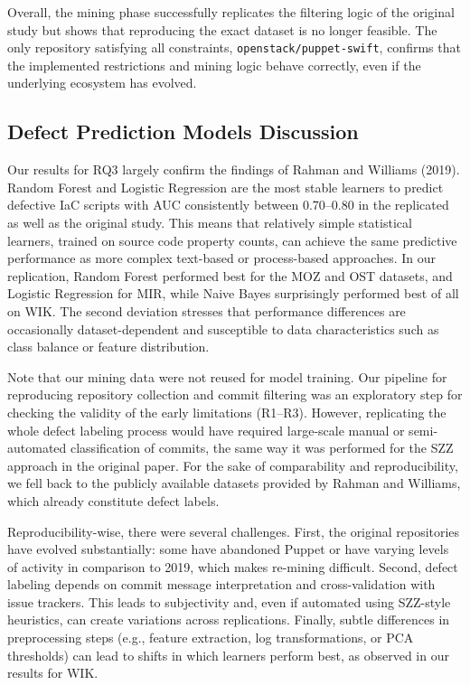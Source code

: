\documentclass[conference]{IEEEtran}
\begin{document}
Overall, the mining phase successfully replicates the filtering logic of the original study but shows that reproducing the exact dataset is no longer feasible. The only repository satisfying all constraints, \texttt{openstack/puppet-swift}, confirms that the implemented restrictions and mining logic behave correctly, even if the underlying ecosystem has evolved.

\subsection{Defect Prediction Models Discussion}
Our results for RQ3 largely confirm the findings of Rahman and Williams (2019).
Random Forest and Logistic Regression are the most stable learners to predict defective IaC scripts with AUC consistently between 0.70–0.80 in the replicated as well as the original study.
This means that relatively simple statistical learners, trained on source code property counts, can achieve the same predictive performance as more complex text-based or process-based approaches.
In our replication, Random Forest performed best for the MOZ and OST datasets, and Logistic Regression for MIR, while Naive Bayes surprisingly performed best of all on WIK.
The second deviation stresses that performance differences are occasionally dataset-dependent and susceptible to data characteristics such as class balance or feature distribution.

Note that our mining data were not reused for model training.
Our pipeline for reproducing repository collection and commit filtering was an exploratory step for checking the validity of the early limitations (R1–R3).
However, replicating the whole defect labeling process would have required large-scale manual or semi-automated classification of commits, the same way it was performed for the SZZ approach in the original paper.
For the sake of comparability and reproducibility, we fell back to the publicly available datasets provided by Rahman and Williams, which already constitute defect labels.

Reproducibility-wise, there were several challenges.
First, the original repositories have evolved substantially: some have abandoned Puppet or have varying levels of activity in comparison to 2019, which makes re-mining difficult.
Second, defect labeling depends on commit message interpretation and cross-validation with issue trackers.
This leads to subjectivity and, even if automated using SZZ-style heuristics, can create variations across replications.
Finally, subtle differences in preprocessing steps (e.g., feature extraction, log transformations, or PCA thresholds) can lead to shifts in which learners perform best, as observed in our results for WIK.
\end{document}
